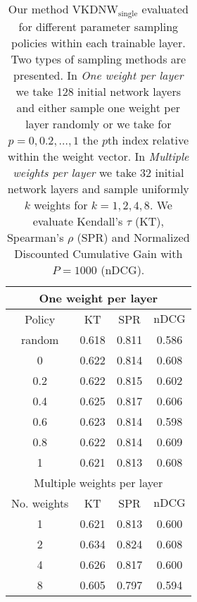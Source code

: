 \begin{table}
  \centering
  \small
  \begin{tabular}{c|ccc}
  \toprule
\multicolumn{4}{c}{One weight per layer} \\
\hline
Policy & KT & SPR & $\text{nDCG}$ \\
\hline
random & 0.618 & 0.811 & 0.586 \\
0 & 0.622 & 0.814 & 0.608 \\
0.2 & 0.622 & 0.815 & 0.602 \\
0.4 & 0.625 & 0.817 & 0.606 \\
0.6 & 0.623 & 0.814 & 0.598 \\
0.8 & 0.622 & 0.814 & 0.609 \\
1 & 0.621 & 0.813 & 0.608 \\
\hline
\multicolumn{4}{c}{Multiple weights per layer}\\
\hline
No. weights & KT & SPR & $\text{nDCG}$ \\
\hline
1 & 0.621 & 0.813 & 0.600 \\
2 & 0.634 & 0.824 & 0.608 \\
4 & 0.626 & 0.817 & 0.600 \\
8 & 0.605 & 0.797 & 0.594 \\
\bottomrule
  \end{tabular}
  \caption{Our method $\text{VKDNW}_{\text{single}}$ evaluated for different parameter sampling policies within each trainable layer. Two types of sampling methods are presented. In \textit{One weight per layer} we take 128 initial network layers and either sample one weight per layer randomly or we take for $p=0, 0.2,\dots, 1$ the $p$th index relative within the weight vector. In \textit{Multiple weights per layer} we take 32 initial network layers and sample uniformly $k$ weights for $k=1,2,4,8$. We evaluate Kendall's $\tau$ (KT), Spearman's $\rho$ (SPR) and Normalized Discounted Cumulative Gain with $P=1000$ (nDCG).}
    \label{tab:fim_index_choice}
\end{table}